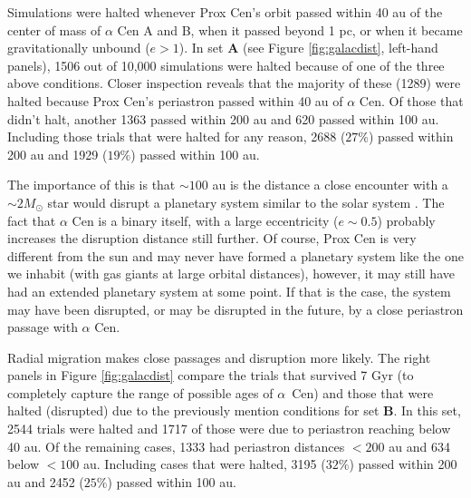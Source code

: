 \documentclass[preprint,12pt]{aastex}
\def\acen{{$\alpha$~Cen}}
\begin{document}
Simulations were halted whenever Prox Cen's orbit passed within 40 au of 
the center of mass of $\alpha$ Cen A and B, when it passed beyond 1 pc,
or when it became gravitationally unbound ($e > 1$). In set \textbf{A} 
(see Figure \ref{fig:galacdist}, left-hand panels), 1506 
out of 10,000 simulations were halted because of one of the three above conditions.
Closer inspection reveals that the majority of these (1289) were halted because 
Prox Cen's periastron passed within 40 au of $\alpha$ Cen. Of those that didn't
halt, another 1363 passed within 200 au and 620 passed within 100 au. Including 
those trials that were halted for any reason, 2688 ($27\%$) passed within 200 au and
1929 ($19\%$) passed within 100 au. 

The importance of this is that $\sim 100$ au is the distance a close encounter with a 
$\sim 2 M_{\odot}$ star would disrupt a planetary system similar to the solar system
\citep{Kaib13}. The fact that $\alpha$ Cen is a binary itself, with a large eccentricity 
($e \sim 0.5$) probably increases the disruption distance still further.
Of course, Prox Cen is very different from the sun and may never 
have formed a planetary system like the one we inhabit (with gas giants at large 
orbital distances), however, it may still have had an extended planetary system
at some point. If that is the case, the system may have been disrupted, or may be
disrupted in the future, by a close periastron passage with $\alpha$ Cen.

Radial migration makes close passages and disruption more likely. The right 
panels in Figure \ref{fig:galacdist} compare the trials that survived 7 Gyr (to completely 
capture the range of possible ages of \acen)
and those that were halted (disrupted) due to the previously mention conditions 
for set \textbf{B}. In this set, 2544 trials were halted and 1717 of those were 
due to periastron reaching below 40 au. Of the remaining cases, 1333 had 
periastron distances $< 200$ au and 634 below $<100$ au. Including
cases that were halted, 3195 ($32\%$) passed within 200 au and 2452 ($25\%$) 
passed within 100 au.
\end{document}
